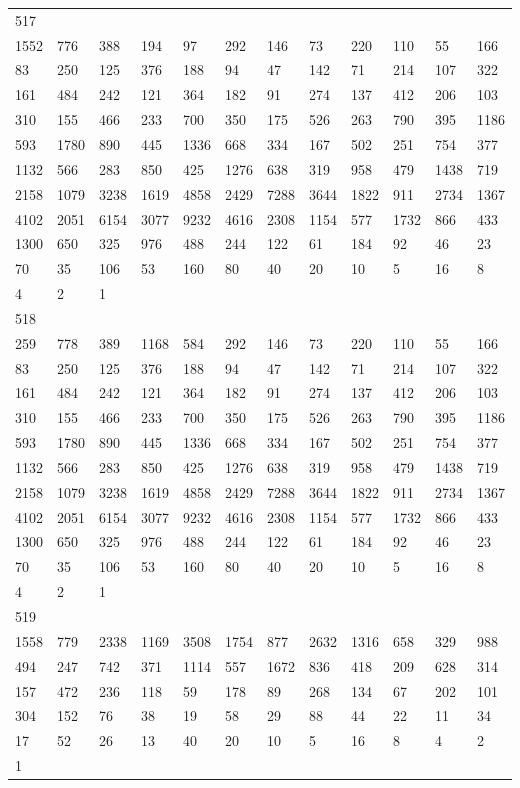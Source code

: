 \begin{longtable}{llllllllllll}
517&&&&&&&&&&&\\
1552& 776& 388& 194& 97& 292& 146& 73& 220& 110& 55& 166\\
83& 250& 125& 376& 188& 94& 47& 142& 71& 214& 107& 322\\
161& 484& 242& 121& 364& 182& 91& 274& 137& 412& 206& 103\\
310& 155& 466& 233& 700& 350& 175& 526& 263& 790& 395& 1186\\
593& 1780& 890& 445& 1336& 668& 334& 167& 502& 251& 754& 377\\
1132& 566& 283& 850& 425& 1276& 638& 319& 958& 479& 1438& 719\\
2158& 1079& 3238& 1619& 4858& 2429& 7288& 3644& 1822& 911& 2734& 1367\\
4102& 2051& 6154& 3077& 9232& 4616& 2308& 1154& 577& 1732& 866& 433\\
1300& 650& 325& 976& 488& 244& 122& 61& 184& 92& 46& 23\\
70& 35& 106& 53& 160& 80& 40& 20& 10& 5& 16& 8\\
4& 2& 1& \\

518&&&&&&&&&&&\\
259& 778& 389& 1168& 584& 292& 146& 73& 220& 110& 55& 166\\
83& 250& 125& 376& 188& 94& 47& 142& 71& 214& 107& 322\\
161& 484& 242& 121& 364& 182& 91& 274& 137& 412& 206& 103\\
310& 155& 466& 233& 700& 350& 175& 526& 263& 790& 395& 1186\\
593& 1780& 890& 445& 1336& 668& 334& 167& 502& 251& 754& 377\\
1132& 566& 283& 850& 425& 1276& 638& 319& 958& 479& 1438& 719\\
2158& 1079& 3238& 1619& 4858& 2429& 7288& 3644& 1822& 911& 2734& 1367\\
4102& 2051& 6154& 3077& 9232& 4616& 2308& 1154& 577& 1732& 866& 433\\
1300& 650& 325& 976& 488& 244& 122& 61& 184& 92& 46& 23\\
70& 35& 106& 53& 160& 80& 40& 20& 10& 5& 16& 8\\
4& 2& 1& \\

519&&&&&&&&&&&\\
1558& 779& 2338& 1169& 3508& 1754& 877& 2632& 1316& 658& 329& 988\\
494& 247& 742& 371& 1114& 557& 1672& 836& 418& 209& 628& 314\\
157& 472& 236& 118& 59& 178& 89& 268& 134& 67& 202& 101\\
304& 152& 76& 38& 19& 58& 29& 88& 44& 22& 11& 34\\
17& 52& 26& 13& 40& 20& 10& 5& 16& 8& 4& 2\\
1& \\


\end{longtable}

